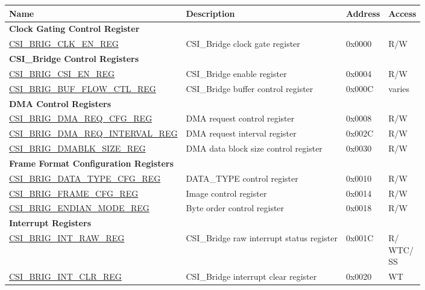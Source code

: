 \begin{longtable}{ | p{6cm} | p{7.2cm} | p{1.3cm} | p{1cm} | }
\hline\rowcolor{lightgray}
{\bfseries Name} & {\bfseries Description} &  {\bfseries Address} & {\bfseries Access} \\ \hline
\endhead
\multicolumn{4}{|l|}{\textbf{Clock Gating Control Register}} \\ \hline
\hyperref[regdesc:CSIBRIGCLKENREG]{CSI\_BRIG\_CLK\_EN\_REG} & CSI\_Bridge clock gate register & 0x0000 & R/W \\ \hline
\multicolumn{4}{|l|}{\textbf{CSI\_Bridge Control Registers}} \\ \hline
\hyperref[regdesc:CSIBRIGCSIENREG]{CSI\_BRIG\_CSI\_EN\_REG} & CSI\_Bridge enable register & 0x0004 & R/W \\ \hline
\hyperref[regdesc:CSIBRIGBUFFLOWCTLREG]{CSI\_BRIG\_BUF\_FLOW\_CTL\_REG} & CSI\_Bridge buffer control register & 0x000C & varies \\ \hline
\multicolumn{4}{|l|}{\textbf{DMA Control Registers}} \\ \hline
\hyperref[regdesc:CSIBRIGDMAREQCFGREG]{CSI\_BRIG\_DMA\_REQ\_CFG\_REG} & DMA request control register & 0x0008 & R/W \\ \hline
\hyperref[regdesc:CSIBRIGDMAREQINTERVALREG]{CSI\_BRIG\_DMA\_REQ\_INTERVAL\_REG} & DMA request interval register & 0x002C & R/W \\ \hline
\hyperref[regdesc:CSIBRIGDMABLKSIZEREG]{CSI\_BRIG\_DMABLK\_SIZE\_REG} & DMA data block size control register & 0x0030 & R/W \\ \hline
\multicolumn{4}{|l|}{\textbf{Frame Format Configuration Registers}} \\ \hline
\hyperref[regdesc:CSIBRIGDATATYPECFGREG]{CSI\_BRIG\_DATA\_TYPE\_CFG\_REG} & DATA\_TYPE control register & 0x0010 & R/W \\ \hline
\hyperref[regdesc:CSIBRIGFRAMECFGREG]{CSI\_BRIG\_FRAME\_CFG\_REG} & Image control register & 0x0014 & R/W \\ \hline
\hyperref[regdesc:CSIBRIGENDIANMODEREG]{CSI\_BRIG\_ENDIAN\_MODE\_REG} & Byte order control register & 0x0018 & R/W \\ \hline
\multicolumn{4}{|l|}{\textbf{Interrupt Registers}} \\ \hline
\hyperref[regdesc:CSIBRIGINTRAWREG]{CSI\_BRIG\_INT\_RAW\_REG} & CSI\_Bridge raw interrupt status register & 0x001C & \makecell[l]{R/\\WTC/\\SS} \\ \hline
\hyperref[regdesc:CSIBRIGINTCLRREG]{CSI\_BRIG\_INT\_CLR\_REG} & CSI\_Bridge interrupt clear register & 0x0020 & WT \\ \hline

\end{longtable}
